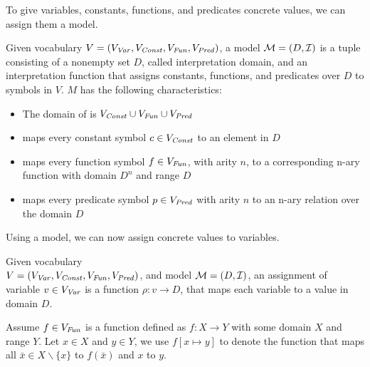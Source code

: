 To give variables, constants, functions, and predicates concrete values, we can assign them a model.
\begin{mydef}[Model]
	Given vocabulary $V = (V_{\mathit{Var}}, V_{\mathit{Const}}, V_{\mathit{Fun}}, V_{\mathit{Pred}})$, a model $\mathcal{M} = (D, \mathcal{I})$ is a tuple consisting of a nonempty set $D$, called interpretation domain, and an interpretation function \interpret that assigns constants, functions, and predicates over $D$ to symbols in $V$. $M$ has the following characteristics:
	\begin{itemize}
		\item The domain of \interpret is $V_{\mathit{Const}} \cup V_{\mathit{Fun}} \cup V_{\mathit{Pred}}$
		\item \interpret maps every constant symbol $c \in V_{\mathit{Const}}$ to an element in $D$
		\item \interpret maps every function symbol $f \in V_{\mathit{Fun}}$, with arity $n$, to a corresponding n-ary function with domain $D^n$ and range $D$
		\item \interpret maps every predicate symbol $p \in V_{\mathit{Pred}}$ with arity $n$ to an n-ary relation over the domain $D$
	\end{itemize}
\end{mydef}
Using a model, we can now assign concrete values to variables.
\begin{mydef}
	Given vocabulary \\ $V = (V_{\mathit{Var}}, V_{\mathit{Const}}, V_{\mathit{Fun}}, V_{\mathit{Pred}})$, and model $\mathcal{M} = (D, \mathcal{I})$, an assignment of variable $v \in V_{\mathit{Var}}$ is a function $\rho: v \rightarrow D$, that maps each variable to a value in domain $D$.
\end{mydef}
Assume $f \in V_{\mathit{Fun}}$ is a function defined as $f: X \rightarrow Y$ with some domain $X$ and range $Y$. Let $x \in X$ and $y \in Y$, we use $f[x \mapsto y]$  to denote the function that maps all $\bar{x} \in X \backslash \{ x \}$ to $f(\bar{x})$ and $x$ to $y$.

